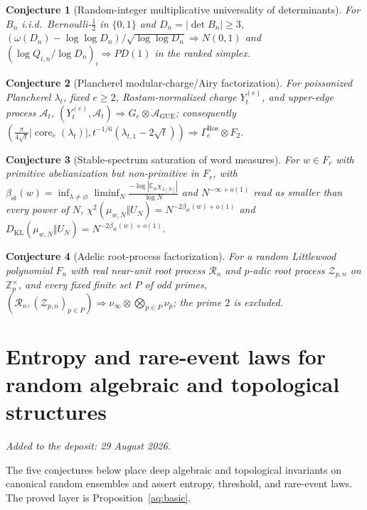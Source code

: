 \documentclass[11pt]{article}
\newtheorem{conjecture}{Conjecture}
\theoremstyle{definition}
\newcommand{\E}{\mathbb E}
\newcommand{\Z}{\mathbb Z}
\providecommand{\Z}{\mathbb Z}
\providecommand{\E}{\mathbb E}
\begin{document}
\begin{conjecture}[Random-integer multiplicative universality of determinants]\label{ap2}
For $B_n$ i.i.d.\ Bernoulli-$\tfrac12$ in $\{0,1\}$ and $D_n=|\det B_n|\ge3$, $(\omega(D_n)-\log\log D_n)/\sqrt{\log\log D_n}\Rightarrow N(0,1)$ and $(\log Q_{i,n}/\log D_n)_i\Rightarrow PD(1)$ in the ranked simplex.
\end{conjecture}

\begin{conjecture}[Plancherel modular-charge/Airy factorization]\label{ap3}
For poissonized Plancherel $\lambda_t$, fixed $e\ge2$, Rostam-normalized charge $Y_t^{(e)}$, and upper-edge process $\mathcal A_t$, $(Y_t^{(e)},\mathcal A_t)\Rightarrow G_e\otimes\mathcal A_{\mathrm{GUE}}$; consequently $(\tfrac{\pi}{4\sqrt t}|\operatorname{core}_e(\lambda_t)|,t^{-1/6}(\lambda_{t,1}-2\sqrt t))\Rightarrow\Gamma_e^{\mathrm{Ros}}\otimes F_2$.
\end{conjecture}

\begin{conjecture}[Stable-spectrum saturation of word measures]\label{ap4}
For $w\in F_r$ with primitive abelianization but non-primitive in $F_r$, with $\beta_{\mathrm{st}}(w)=\inf_{\lambda\ne\varnothing}\liminf_N\frac{-\log|\E_w\chi_{\lambda[N]}|}{\log N}$ and $N^{-\infty+o(1)}$ read as smaller than every power of $N$, $\chi^2(\mu_{w,N}\Vert U_N)=N^{-2\beta_{\mathrm{st}}(w)+o(1)}$ and $D_{\mathrm{KL}}(\mu_{w,N}\Vert U_N)=N^{-2\beta_{\mathrm{st}}(w)+o(1)}$.
\end{conjecture}

\begin{conjecture}[Adelic root-process factorization]\label{ap5}
For a random Littlewood polynomial $F_n$ with real near-unit root process $\mathcal R_n$ and $p$-adic root process $\mathcal Z_{p,n}$ on $\Z_p^\times$, and every fixed finite set $P$ of odd primes, $(\mathcal R_n,(\mathcal Z_{p,n})_{p\in P})\Rightarrow\nu_\infty\otimes\bigotimes_{p\in P}\nu_p$; the prime $2$ is excluded.
\end{conjecture}


\part{Entropy and rare-event laws for random algebraic and topological structures}

\medskip\noindent\emph{Added to the deposit: 29 August 2026.}\par\medskip

The five conjectures below place deep algebraic and topological invariants on canonical random ensembles and assert entropy, threshold, and rare-event laws.  The proved layer is Proposition~\ref{aq:basic}.
\end{document}
